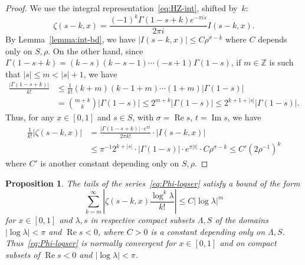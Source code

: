 \documentclass[11pt,a4paper,reqno]{amsart}
\newcommand{\Z}{\mathbb{Z}}
\renewcommand{\Re}{\operatorname{Re}}
\renewcommand{\Im}{\operatorname{Im}}
\theoremstyle{plain}
\newtheorem{prop}[theorem]{Proposition}
\theoremstyle{remark}
\numberwithin{equation}{section}
\begin{document}
\begin{proof}
We use the integral representation~\eqref{eq:HZ-int}, shifted by~$k$:
\[
	  \zeta(s-k,x) 
	= \frac{(-1)^{k} \Gamma(1-s+k) e^{-\pi i s}}{2\pi i} I(s-k,x).
\]
By Lemma~\ref{lemma:int-bd}, we have $|I(s-k,x)| \leq C \rho^{\sigma - k}$ where $C$ depends only on $S,\rho$.
On the other hand, since $\Gamma(1-s+k) = (k-s)(k-s-1)\cdots(-s+1)\Gamma(1-s)$, if $m \in \Z$ is such that $|s| \leq m < |s| + 1$, we have
\begin{align*}
	      \frac{|\Gamma(1-s+k)|}{k!}
	&\leq \frac{1}{k!}(k + m)(k - 1 + m) \cdots (1 + m) |\Gamma(1-s)|
	\\
	&=    \binom{m+k}{k} |\Gamma(1-s)|
	 \leq 2^{m+k} |\Gamma(1-s)|
	 \leq 2^{k + 1 + |s|} |\Gamma(1-s)|.
\end{align*}
Thus, for any $x \in [0,1]$ and $s \in S$, with $\sigma = \Re s$, $t = \Im s$, we have
\begin{align*}
	      \frac{1}{k!}|\zeta(s-k,x)|
	&=    \frac{|\Gamma(1-s+k)| \cdot e^{\pi t}}{2\pi k!} \cdot |I(s-k,x)|
	\\
	&\leq \pi^{-1} 2^{k+|s|} \cdot |\Gamma(1-s)| \cdot e^{\pi |t|} \cdot C\rho^{\sigma-k}
	 \leq C' (2 \rho^{-1})^{k}
\end{align*}
where $C'$ is another constant depending only on $S,\rho$.
\end{proof}


\begin{prop}
\label{prop:logser-unifconv}
The tails of the series~\eqref{eq:Phi-logser} satisfy a bound of the form
%
\begin{equation}
\label{eq:tail-bd}
     \sum_{k=m}^{\infty} \left| \zeta(s-k,x) \frac{\log^{k}\lambda}{k!}\right|
\leq C |\log\lambda|^{m}
\end{equation}
%
for $x \in [0,1]$ and $\lambda,s$ in respective compact subsets $\Lambda,S$ of the domains $|\log\lambda| < \pi$ and $\Re s < 0$, where $C > 0$ is a constant depending only on $\Lambda,S$. Thus~\eqref{eq:Phi-logser} is normally convergent for $x \in [0,1]$ and on compact subsets of $\Re s < 0$ and $|\log\lambda| < \pi$.
\end{prop}
\end{document}
